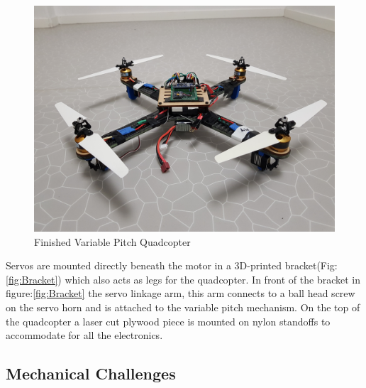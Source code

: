 \begin{figure}[H]
\begin{minipage}[b]{0.5\textwidth}
            \includegraphics[width = \textwidth, angle =0]{VAPIQ-PICTURES/vpqquad}
              \caption{Finished Variable Pitch Quadcopter}
        \end{minipage}
        \end{figure}


Servos are mounted directly beneath the motor in a 3D-printed bracket(Fig:\ref{fig:Bracket}) which also acts as legs for the quadcopter. In front of the bracket in figure:\ref{fig:Bracket} the servo linkage arm, this arm connects to a ball head screw on the servo horn and is attached to the variable pitch mechanism. On the top of the quadcopter a laser cut plywood piece is mounted on nylon standoffs to accommodate for all the electronics.



\newpage

\subsection{Mechanical Challenges}


